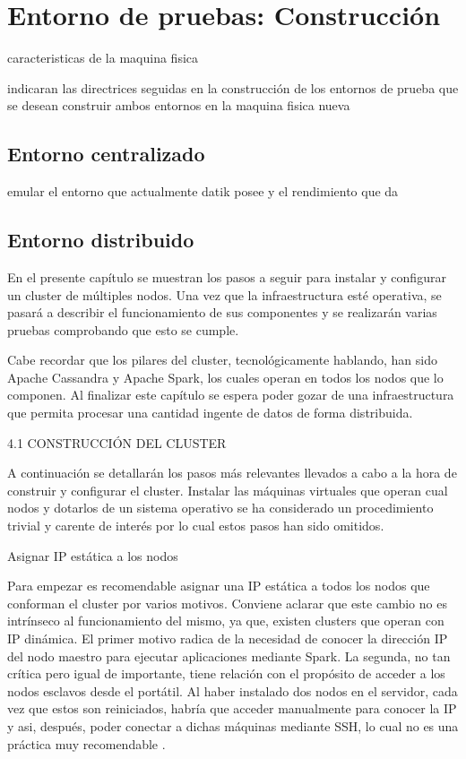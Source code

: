 
\pagestyle{fancy}

\chapter{Entorno de pruebas: Construcción}
\label{entorno_pruebas}

caracteristicas de la maquina fisica

indicaran las directrices seguidas en la construcción de los entornos de prueba que se desean construir
ambos entornos en la maquina fisica nueva

\section{Entorno centralizado}

emular el entorno que actualmente datik posee y el rendimiento que da


\section{Entorno distribuido}

En el presente capítulo se muestran los pasos a seguir para instalar y configurar un cluster de múltiples nodos. Una vez que la infraestructura esté operativa, se pasará a describir el funcionamiento de sus componentes y se realizarán varias pruebas comprobando que esto se cumple. 

Cabe recordar que los pilares del cluster, tecnológicamente hablando, han sido Apache Cassandra y Apache Spark, los cuales operan en todos los nodos que lo componen. Al finalizar este capítulo se espera poder gozar de una infraestructura  que permita procesar una cantidad ingente de datos de forma distribuida.

4.1 CONSTRUCCIÓN DEL CLUSTER

A continuación se detallarán los pasos más relevantes llevados a cabo a la hora de construir y configurar el cluster. Instalar las máquinas virtuales que operan cual nodos y dotarlos de un sistema operativo se ha considerado un procedimiento trivial y carente de interés por lo cual estos pasos han sido omitidos. 

Asignar IP estática a los nodos

Para empezar es recomendable asignar una IP estática a todos los nodos que conforman el cluster por varios motivos. Conviene aclarar que este cambio no es intrínseco al funcionamiento del mismo, ya que, existen clusters que operan con IP dinámica. El primer motivo radica de la necesidad de conocer la dirección IP del nodo maestro para ejecutar aplicaciones mediante Spark. La segunda, no tan crítica pero igual de importante, tiene relación con el propósito de acceder a los nodos esclavos desde el portátil. Al haber instalado dos nodos en el servidor, cada vez que estos son reiniciados, habría que acceder manualmente para conocer la IP y asi, después, poder conectar a dichas máquinas mediante SSH, lo cual no es una práctica muy recomendable .  

